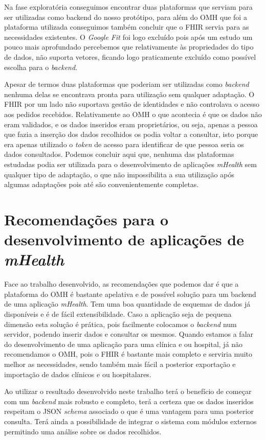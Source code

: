 Na fase exploratória conseguimos encontrar duas plataformas que serviam para ser utilizadas como backend do nosso protótipo, para além do \gls{OMH} que foi a plataforma utilizada conseguimos também concluir que o \gls{FHIR} servia para as necessidades existentes. O \textit{Google Fit} foi logo excluído pois após um estudo um pouco mais aprofundado percebemos que relativamente às propriedades do tipo de dados, não suporta vetores, ficando logo praticamente excluído como possível escolha para o \textit{backend}.\par 
Apesar de termos duas plataformas que poderiam ser utilizadas como \textit{backend} nenhuma delas se encontrava pronta para utilização sem qualquer adaptação. O \gls{FHIR} por um lado não suportava gestão de identidades e não controlava o acesso aos pedidos recebidos. Relativamente ao \gls{OMH} o que acontecia é que os dados não eram validados, e os dados inseridos eram proprietários, ou seja, apenas a pessoa que fazia a inserção dos dados recolhidos os podia voltar a consultar, isto porque era apenas utilizado o \textit{token} de acesso para identificar de que pessoa seria os dados consultados.
Podemos concluir aqui que, nenhuma das plataformas estudadas podia ser utilizada para o desenvolvimento de aplicações \textit{mHealth} sem qualquer tipo de adaptação, o que não impossibilita a sua utilização após algumas adaptações pois até são convenientemente completas.

\section{Recomendações para o desenvolvimento de aplicações de \textit{mHealth}}


Face ao trabalho desenvolvido, as recomendações que podemos dar é que a plataforma do \gls{OMH} é bastante apelativa e de possível solução para um backend de uma aplicação \textit{mHealth}. Tem uma boa quantidade de esquemas de dados já disponíveis e é de fácil extensibilidade. Caso a aplicação seja de pequena dimensão esta solução é prática, pois facilmente colocamos o \textit{backend} num servidor, podendo inserir dados e consultar os mesmos. Quando estamos a falar do desenvolvimento de uma aplicação para uma clínica e ou hospital, já não recomendamos o \gls{OMH}, pois o \gls{FHIR} é bastante mais completo e serviria muito melhor as necessidades, sendo também mais fácil a posterior exportação e importação de dados clínicos e ou hospitalares. \par
Ao utilizar o resultado desenvolvido neste trabalho terá o benefício de começar com um \textit{backend} mais robusto e completo, terá a certeza que os dados inseridos respeitam o \gls{JSON} \textit{schema} associado o que é uma vantagem para uma posterior consulta. Terá ainda a possibilidade de integrar o sistema com módulos externos permitindo uma análise sobre os dados recolhidos.


\cleardoublepage